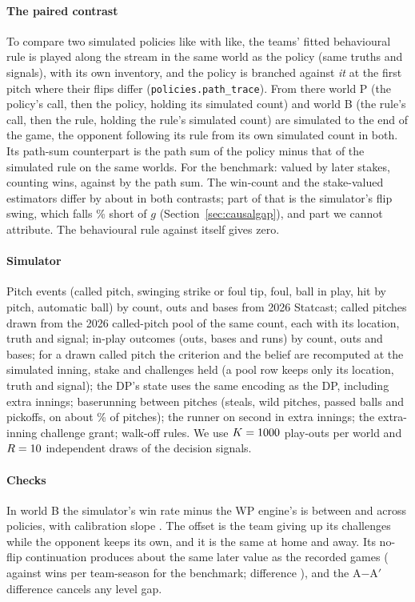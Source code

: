 \documentclass[aoas]{imsart}
\theoremstyle{plain}
\theoremstyle{definition}
\begin{document}
\paragraph{The paired contrast} To compare two simulated policies like with like, the teams' fitted behavioural rule
is played along the stream in the same world as the policy (same truths and signals), with its own inventory, and the
policy is branched against \emph{it} at the first pitch where their flips differ (\texttt{policies.path\_trace}). From
there world P (the policy's call, then the policy, holding its simulated count) and world B (the rule's call, then the
rule, holding the rule's simulated count) are simulated to the end of the game, the opponent following its rule from
its own simulated count in both. Its path-sum counterpart is the path sum of the policy minus that of the simulated
rule on the same worlds. For the benchmark: \PairRB{} \PairRBCI{} valued by later stakes, \PairWin{} counting wins,
against \PairPath{} by the path sum. The win-count and the stake-valued estimators differ by about \WinMinusRBAbs{} in
both contrasts; part of that is the simulator's flip swing, which falls \SimGShareRunGap\% short of $g$
(Section~\ref{sec:causalgap}), and part we cannot attribute. The behavioural rule against itself gives zero.

\paragraph{Simulator} Pitch events (called pitch, swinging strike or foul tip, foul, ball in play, hit by pitch,
automatic ball) by count, outs and bases from 2026 Statcast; called pitches drawn from the 2026 called-pitch pool of
the same count, each with its location, truth and signal; in-play
outcomes (outs, bases and runs) by count, outs and bases; for a drawn called pitch the criterion and the belief are
recomputed at the simulated inning, stake and challenges held (a pool row keeps only its location, truth and signal);
the DP's state uses the same encoding as the DP, including extra innings; baserunning between pitches (steals, wild pitches, passed
balls and pickoffs, on about \SGapMoveRate\% of pitches); the runner on second in extra innings; the extra-inning
challenge grant; walk-off rules. We use $K=1000$ play-outs per world and $R=10$ independent draws of the
decision signals.

\paragraph{Checks} In world B the simulator's win rate minus the WP engine's is between \SCalibWinBLo{} and
\SCalibWinBHi{} across policies, with calibration slope \SCalibSlope. The offset is the team giving up its challenges
while the opponent keeps its own, and it is the same at home and away. Its no-flip continuation produces about the
same later value as the recorded games (\SLaterNoflip{} against \SLaterRecorded{} wins per team-season for the
benchmark; difference \SFidelity{} \SFidelityCI), and the A$-$A$'$ difference cancels any level gap.
\end{document}
